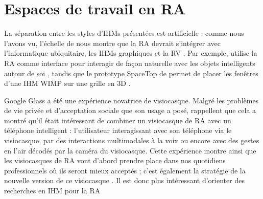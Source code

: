 



\section{Espaces de travail en RA}
\label{sec:litterature_ar_worspaces}
La séparation entre les styles d'IHMs présentées \cite{Rekimoto1995}  est artificielle : comme nous l'avons vu, l'échelle de \cite{Milgram1994} nous montre que la RA devrait s'intégrer avec l'informatique ubiquitaire, les IHMs graphiques et la RV \cite{Billinghurst2005}. Par exemple, \cite{Heun2013} utilise la RA comme interface pour interagir de façon naturelle avec les objets intelligents autour de soi , tandis que le prototype SpaceTop de \cite{Lee2013} permet de placer les fenêtres d'une IHM WIMP sur une grille en 3D .


Google Glass a été une expérience novatrice de visiocasque. Malgré les problèmes de vie privée et d'acceptation sociale que son usage a posé, \cite{Koelle2015} rappellent que cela a montré qu'il était intéressant de combiner un visiocasque de RA avec un téléphone intelligent : l'utilisateur interagissant avec son téléphone via le visiocasque, par des interactions multimodales à la voix ou encore avec des gestes en l'air décodés par la caméra du visiocasque. Cette expérience montre ainsi que les visiocasques de RA vont d'abord prendre place dans nos quotidiens professionnels où ils seront mieux acceptés ; c'est également la stratégie de la nouvelle version de ce visiocasque \cite{Levy2017}. Il est donc plus intéressant d'orienter des recherches en IHM pour la RA

